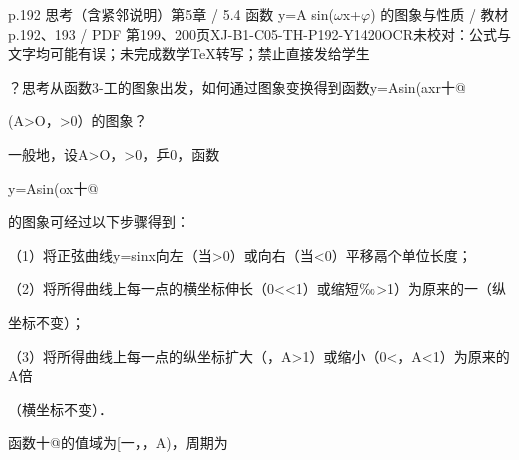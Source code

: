 \begin{bankitem}{p.192 思考（含紧邻说明）}{第5章 / 5.4 函数 y=A sin(\ensuremath{\omega}x+\ensuremath{\varphi}) 的图象与性质 / 教材 p.192、193 / PDF 第199、200页}{XJ-B1-C05-TH-P192-Y1420}{OCR未校对：公式与文字均可能有误；未完成数学TeX转写；禁止直接发给学生}
\begin{ocrdraft}
\par
？思考从函数3-工的图象出发，如何通过图象变换得到函数y=Asin(axr十@
\par
(A>O，>0）的图象？
\par
一般地，设A>O，>0，乒0，函数
\par
y=Asin(ox十@
\par
的图象可经过以下步骤得到：
\par
[教材p.193 / PDF第200页]
\par
（1）将正弦曲线y=sinx向左（当>0）或向右（当<0）平移鬲个单位长度；
\par
（2）将所得曲线上每一点的横坐标伸长（0<<1）或缩短\ensuremath{\text{\textperthousand}}>1）为原来的一（纵
\par
坐标不变）；
\par
（3）将所得曲线上每一点的纵坐标扩大（，A>1）或缩小（0<，A<1）为原来的A倍
\par
（横坐标不变）．
\par
函数十@的值域为[一，，A)，周期为
\end{ocrdraft}
\end{bankitem}
